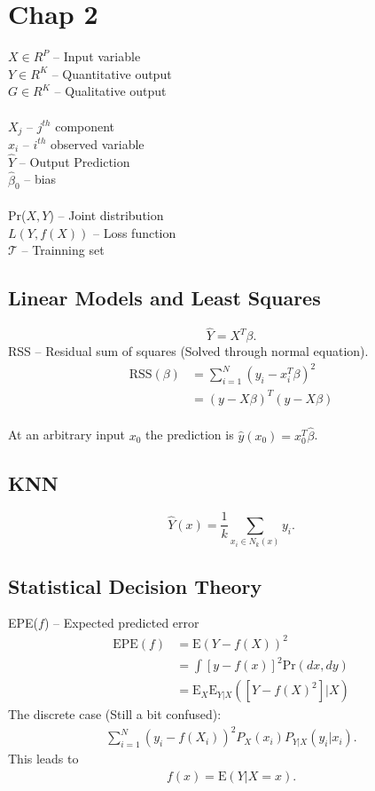 \section*{Chap 2}
$X \in R^P$ -- Input variable \\
$Y \in R^K$ -- Quantitative output \\
$G \in R^K$ -- Qualitative output \\
\\
$X_j$ -- $j^{th}$ component \\
$x_i$ -- $i^{th}$ observed variable \\
$\hat{Y} $ -- Output Prediction \\
$\hat{\beta}_0$ -- bias\\
\\
Pr($X, Y$) -- Joint distribution \\
$L(Y, f(X))$ -- Loss function \\
$\mathcal{T}$ -- Trainning set\\ 


\subsection*{Linear Models and Least Squares}
\begin{equation*}
\hat{Y} = X^T\beta.
\end{equation*}
RSS -- Residual sum of squares (Solved through normal equation).
\begin{align*}
\text{RSS}(\beta) &= \sum_{i=1}^{N}(y_i - x_i^T\beta)^2 \\
&=(y-X\beta)^T(y-X\beta)
\end{align*}
\\
At an arbitrary input $x_0$ the prediction is $\hat{y}(x_0) = x_0^T\hat{\beta}$.

\subsection*{KNN}
\begin{equation*}
\hat{Y}(x) = \frac{1}{k}\sum_{x_i\in N_k(x)}y_i.
\end{equation*}

\subsection*{Statistical Decision Theory}
EPE($f$) -- Expected predicted error \\
\begin{align*}
\text{EPE}(f) &= \text{E}(Y-f(X))^2\\
& = \int [y-f(x)]^2\text{Pr}(dx, dy) \\
& = \text{E}_X\text{E}_{Y|X}([Y-f(X)^2]|X)
\end{align*}
The discrete case (Still a bit confused):
\begin{align*}
\sum_{i=1}^N (y_i - f(X_i))^2 P_X(x_i)P_{Y|X}(y_i|x_i).
\end{align*}
This leads to 
\begin{align*}
f(x) = \text{E}(Y|X=x).
\end{align*}

